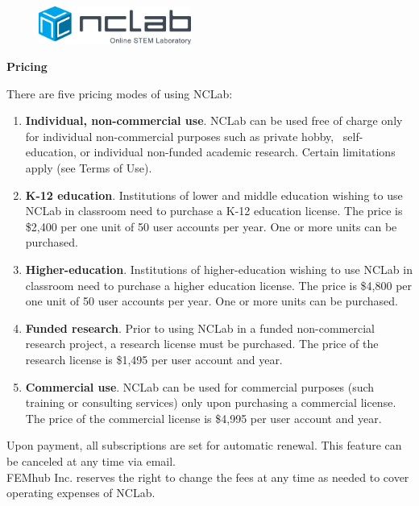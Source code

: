 \documentclass{article}
\begin{document}
\large

\vbox{}
\begin{figure}[!ht]
\includegraphics[width=5cm]{logo.png}
\vspace{4mm}
\end{figure}

\centerline{\huge \bf Pricing}
\vspace{6mm}
\noindent
There are five pricing modes of using NCLab:
\begin{enumerate}
\item {\bf Individual, non-commercial use}. NCLab can be used free of charge only for 
individual non-commercial purposes such as private hobby,  self-education, or individual 
non-funded academic research. Certain limitations apply (see Terms of Use).

\item {\bf K-12 education}. Institutions of lower and middle education wishing to use 
NCLab in classroom need to purchase a K-12 education license. The price is \$2,400 per 
one unit of 50 user accounts per year. One or more units can be purchased. 

\item {\bf Higher-education}. Institutions of higher-education wishing to use NCLab in classroom 
need to purchase a higher education license. The price is \$4,800 per one unit of 50 user accounts 
per year. One or more units can be purchased. 

\item {\bf Funded research}. Prior to using NCLab in a funded non-commercial research project, a research license must be purchased. The price of the research license is \$1,495 per user account and year.

\item {\bf Commercial use}. NCLab can be used for commercial purposes (such training or consulting services) only upon purchasing a commercial license. The price of the commercial license is \$4,995 per user account and year.
\end{enumerate}
Upon payment, all subscriptions are set for automatic renewal. This feature can be 
canceled at any time via email. \\

\noindent
FEMhub Inc. reserves the right to change the fees at any time as needed to cover operating expenses of NCLab. 
\end{document}
